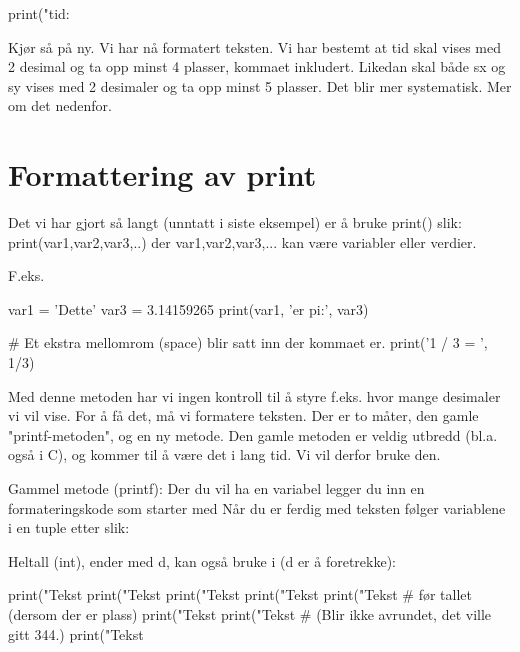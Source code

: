 \begin{usncodebox}
print("tid: %
\end{usncodebox}

Kjør så på ny. Vi har nå formatert teksten. Vi har bestemt at tid skal vises med 2 desimal og ta opp minst 4 plasser, kommaet inkludert. Likedan skal både sx og sy vises med 2 desimaler og ta opp minst 5 plasser. Det blir mer systematisk. Mer om det nedenfor. 

\section{Formattering av print}

Det vi har gjort så langt (unntatt i siste eksempel) er å bruke print() slik: print(var1,var2,var3,..) der var1,var2,var3,... kan være variabler eller verdier.

F.eks.
\begin{usncodebox}
var1 = 'Dette'
var3 = 3.14159265
print(var1, 'er pi:', var3)

# Et ekstra mellomrom (space) blir satt inn der kommaet er. 
print('1 / 3 = ', 1/3)
\end{usncodebox}

Med denne metoden har vi ingen kontroll til å styre f.eks. hvor mange desimaler vi vil vise. For å få det, må vi formatere teksten. Der er to måter, den gamle "printf-metoden", og en ny metode. Den gamle metoden er veldig utbredd (bl.a. også i C), og kommer til å være det i lang tid. Vi vil derfor bruke den. 

Gammel metode (printf):
Der du vil ha en variabel legger du inn en formateringskode som starter 
med %
Når du er ferdig med teksten følger variablene i en tuple etter %
slik: %

Heltall (int), ender med d, kan også bruke i (d er å foretrekke):
\begin{usncodebox}
print("Tekst %
print("Tekst %
print("Tekst %
print("Tekst %
print("Tekst %
                                   # før tallet (dersom der er plass) 
print("Tekst %
print("Tekst %
                                   # (Blir ikke avrundet, det ville gitt 344.)  
print("Tekst %
\end{usncodebox}

